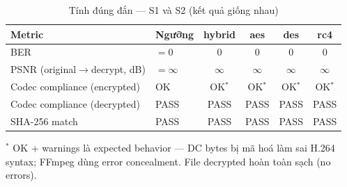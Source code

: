 \begin{table}[ht]
\centering
\caption{Tính đúng đắn — S1 và S2 (kết quả giống nhau)}
\label{tab:correctness}
\begin{tabular}{llcccc}
\toprule
Metric & Ngưỡng & hybrid & aes & des & rc4 \\
\midrule
BER & $= 0$ & 0 & 0 & 0 & 0 \\
PSNR (original$\to$decrypt, dB) & $= \infty$ & $\infty$ & $\infty$ & $\infty$ & $\infty$ \\
Codec compliance (encrypted) & OK & OK$^*$ & OK$^*$ & OK$^*$ & OK$^*$ \\
Codec compliance (decrypted) & PASS & PASS & PASS & PASS & PASS \\
SHA-256 match & PASS & PASS & PASS & PASS & PASS \\
\bottomrule
\end{tabular}
\begin{tablenotes}
\small
\item $^*$ OK + warnings là expected behavior — DC bytes bị mã hoá làm sai H.264 syntax;
FFmpeg dùng error concealment. File decrypted hoàn toàn sạch (no errors).
\end{tablenotes}
\end{table}
